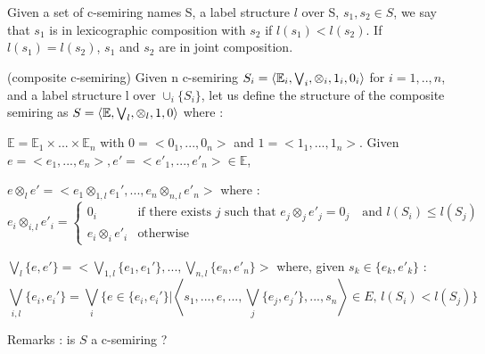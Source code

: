 Given a set of c-semiring names S, a label structure $l$ over S, $s_1,s_2 \in S$, we say that $s_1$ is in lexicographic composition with $s_2$ if $l(s_1)<l(s_2)$. If $l(s_1)=l(s_2)$, $s_1$ and $s_2$ are in joint composition.

\begin{definition} (composite c-semiring) 
	Given n c-semiring $S_i = \left\langle \mathbb{E}_i, \bigvee_i, \otimes_i, \boldmath{1}_i,\boldmath{0}_i \right\rangle $ for $i = 1,..,n$, and a label structure l over $\cup_i\{S_i\} $, let us define the structure of the composite semiring as $S = \left\langle \mathbb{E}, \bigvee_l, \otimes_l, \boldmath{1},\boldmath{0} \right\rangle$ where : 
	\begin{list}{-}{ }
		\item\normalfont $\mathbb{E} = \mathbb{E}_1 \times ... \times \mathbb{E}_n$ with $0 = <0_1,...,0_n> $ and $1 = <1_1,...,1_n> $. Given $e=<e_1,...,e_n>, e'=<e'_1, ..., e'_n> \in \mathbb{E}$,
		
		\item\normalfont $e\otimes_l e' = <e_1\otimes_{1,l} e_1', ..., e_n \otimes_{n,l} e'_n>$ where : $$e_i \otimes_{i,l} e'_i = \begin{cases}
		0_{i} & \text{if there exists } j \text{ such that } e_j \otimes_{j} e'_j = 0_j \quad \text{and } l(S_i) \leq l(S_j)\\
		e_i \otimes_i e'_i & \text{otherwise }  
		\end{cases} $$
		\item $\bigvee_l\{e,e'\} = <\bigvee_{1,l} \{e_1,e_1'\}, ..., \bigvee_{n,l}\{e_n,e'_n\} >$ where, given $s_k \in \{e_k,e'_k\}$ :
		$$\bigvee_{i,l}\{e_i,e_i'\} = \bigvee_i\{e\in \{e_i,e_i'\} | \left \langle s_1, ..., e, ..., \bigvee_j \{e_j,e_j'\}, ..., s_n \right \rangle \in E \text{, }  l(S_i)<l(S_j) \}$$
	\end{list}
\end{definition}

Remarks : is $S$ a c-semiring ?

